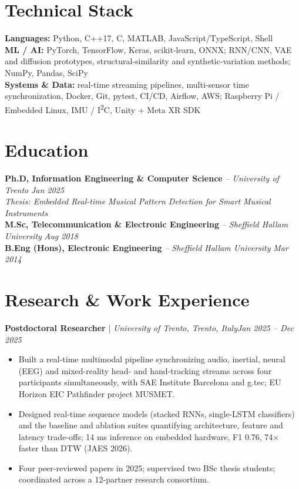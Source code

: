 \documentclass[11pt]{article}
\newenvironment{cvrole}[5]{%
  \par\noindent\textbf{\large #1} | \textit{\small #2, #3}\hfill \textit{\small #4 -- #5}\par
  \begin{itemize}[leftmargin=2em, itemsep=-0.3em, topsep=-0.5em]%
}{%
  \end{itemize}\par\noindent\mbox{}\par\vspace{0.1em}%
}
\begin{document}
\section*{Technical Stack}

\textbf{Languages:} Python, C++17, C, MATLAB, JavaScript/TypeScript, Shell\\
\textbf{ML / AI:} PyTorch, TensorFlow, Keras, scikit-learn, ONNX; RNN/CNN, VAE and diffusion prototypes, structural-similarity and synthetic-variation methods; NumPy, Pandas, SciPy\\
\textbf{Systems \& Data:} real-time streaming pipelines, multi-sensor time synchronization, Docker, Git, pytest, CI/CD, Airflow, AWS; Raspberry Pi / Embedded Linux, IMU / I\textsuperscript{2}C, Unity + Meta XR SDK

\section*{Education}
\textbf{Ph.D, Information Engineering \& Computer Science} \textit{\small{-- University of Trento}} \hfill \textit{Jan 2025}\\[2pt]
\noindent\textit{\small Thesis: Embedded Real-time Musical Pattern Detection for Smart Musical Instruments}\\[3pt]
\noindent\textbf{M.Sc, Telecommunication \& Electronic Engineering} \textit{\small{-- Sheffield Hallam University}} \hfill \textit{Aug 2018}\\[2pt]
\noindent\textbf{B.Eng (Hons), Electronic Engineering} \textit{\small{-- Sheffield Hallam University}} \hfill \textit{Mar 2014}

\section*{Research \& Work Experience}

\begin{cvrole}{Postdoctoral Researcher}{University of Trento}{Trento, Italy}{Jan 2025}{Dec 2025}
    \item Built a real-time multimodal pipeline synchronizing audio, inertial, neural (EEG) and mixed-reality head- and hand-tracking streams across four participants simultaneously, with SAE Institute Barcelona and g.tec; EU Horizon EIC Pathfinder project MUSMET.
    \item Designed real-time sequence models (stacked RNNs, single-LSTM classifiers) and the baseline and ablation suites quantifying architecture, feature and latency trade-offs; 14 ms inference on embedded hardware, F1 0.76, 74$\times$ faster than DTW (JAES 2026).
    \item Four peer-reviewed papers in 2025; supervised two BSc thesis students; coordinated across a 12-partner research consortium.
\end{cvrole}
\end{document}
